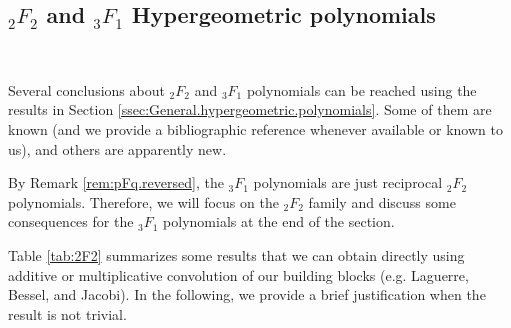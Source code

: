 \documentclass[reqno,11pt]{amsart}
\theoremstyle{remark}
\begin{document}
\subsection{${}_2 F_2$ and ${}_3 F_1$ Hypergeometric polynomials}\label{sec:2F2real}\

Several conclusions about ${}_2 F_2$ and ${}_3 F_1$ polynomials can be reached using the results in Section \ref{ssec:General.hypergeometric.polynomials}. Some of them are known (and we provide a bibliographic reference whenever available or known to us), and others are apparently new.  

By Remark \ref{rem:pFq.reversed}, the ${}_3 F_1$ polynomials are just reciprocal ${}_2 F_2$ polynomials. Therefore, we will focus on the ${}_2 F_2$ family and discuss some consequences for the ${}_3 F_1$ polynomials at the end of the section.

Table \ref{tab:2F2} summarizes some results that we can obtain directly using additive or multiplicative convolution of our building blocks (e.g. Laguerre, Bessel, and Jacobi). In the following, we provide a brief justification when the result is not trivial. 
\end{document}
